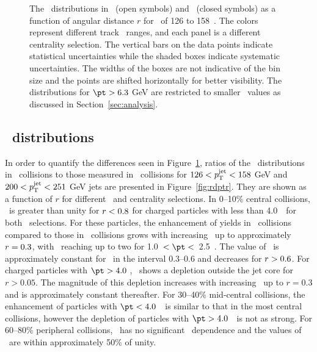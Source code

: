 \begin{figure}[h]
{\begin{tabular}{ccc}
\end{tabular}}
\caption{The \Dptr\ distributions in \pp\ (open symbols) and \pbpb\ (closed symbols) as a function of angular distance $r$ for \ptjet\ of 126 to 158~\GeV.
The colors represent different track \pt\ ranges, and each panel is a different centrality selection.
The vertical bars on the data points indicate statistical uncertainties while the shaded boxes indicate systematic uncertainties.
The widths of the boxes are not indicative of the bin size and the points are shifted horizontally for better visibility.
The distributions for $\pt > 6.3$ GeV are restricted to smaller \rvar\ values as discussed in Section~\ref{sec:analysis}.}
\label{fig:dptr}
\end{figure}



\subsection{\RDptr\ distributions}
\label{sec:rdptr}
In order to quantify the differences seen in Figure~\ref{fig:dptr}, ratios of the \Dptr\ distributions in \pbpb\ collisions to those measured in \pp\ collisions for $126 < \mbox{$p_{\mathrm{T}}^{\mathrm{jet}}$} < 158$ GeV and $200 < \mbox{$p_{\mathrm{T}}^{\mathrm{jet}}$} < 251$ GeV jets are presented in Figure~\ref{fig:rdptr}.
They are shown as a function of $r$ for different \pt\ and centrality selections.
In 0--10\% central collisions, \RDptr\ is greater than unity for $\mbox{$r$} < 0.8$ for charged particles with \pT less than 4.0~\GeV\ for both \ptjet\ selections.
For these particles, the enhancement of yields in \pbpb\ collisions compared to those in \pp\ collisions grows with increasing \rvar\ up to approximately \mbox{$\mbox{$r$}  = 0.3$}, with \RDptr\ reaching up to two for 1.0~$< \pt <$~2.5~\GeV.
The value of \RDptr\ is approximately constant for \rvar\ in the interval \mbox{0.3--0.6} and decreases for \mbox{$\mbox{$r$} > 0.6$}.
For charged particles with $\pt > 4.0$ \GeV, \RDptr\ shows a depletion outside the jet core for $r > 0.05$.
The magnitude of this depletion increases with increasing \rvar\ up to $r = 0.3$ and is approximately constant thereafter.
For 30--40\% mid-central collisions, the enhancement of particles with $\pt < 4.0$~\GeV\ is similar to that in the most central collisions, however the depletion of particles with $\pt > 4.0$~\GeV\ is not as strong.
For 60--80\% peripheral collisions, \RDptr\ has no significant \rvar\ dependence and the values of \RDptr\ are within approximately 50\% of unity.

